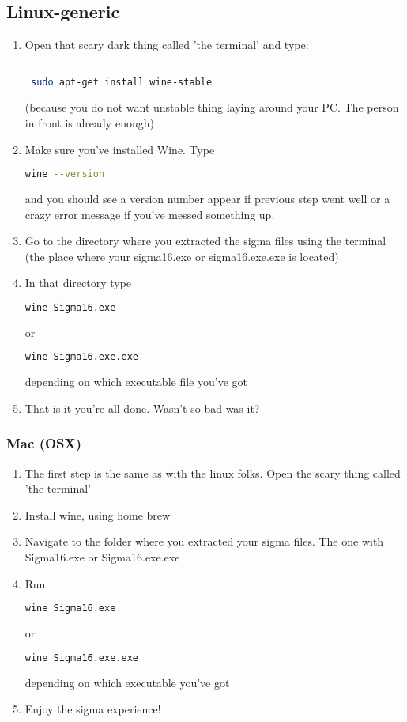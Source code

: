 \documentclass{article}
\begin{document}
 \subsection{Linux-generic}
 \begin{enumerate}
      
 
   \item Open that scary dark thing called 'the terminal' and type: 
\begin{lstlisting}[language=Bash]

 sudo apt-get install wine-stable
\end{lstlisting}
    (because you do not want unstable thing laying around your PC. The person in front is already enough)
   \item Make sure you've installed Wine. Type
\begin{lstlisting}[language=Bash]
wine --version
\end{lstlisting}
and you should see a version number appear if previous step went well or a crazy error message if you've messed something up.
   \item Go to the directory where you extracted the sigma files using the terminal (the place where your sigma16.exe or sigma16.exe.exe is located)
   \item In that directory type
   \begin{lstlisting}[language=Bash]
   wine Sigma16.exe
\end{lstlisting}
    or 
       \begin{lstlisting}[language=Bash]
   wine Sigma16.exe.exe
\end{lstlisting}
depending on which executable file you've got
   \item That is it you're all done. Wasn't so bad was it?
\end{enumerate}
 \subsubsection{Mac (OSX)}
 \begin{enumerate}
      
   \item The first step is the same as with the linux folks. Open the scary thing called 'the terminal'
   \item Install wine, using home brew
   \item Navigate to the folder where you extracted your sigma files. The one with Sigma16.exe or Sigma16.exe.exe
   \item Run 
      \begin{lstlisting}[language=Bash]
   wine Sigma16.exe
\end{lstlisting}
    or 
       \begin{lstlisting}[language=Bash]
   wine Sigma16.exe.exe
\end{lstlisting}
depending on which executable you've got
   \item Enjoy the sigma experience!
\end{enumerate}
\end{document}

